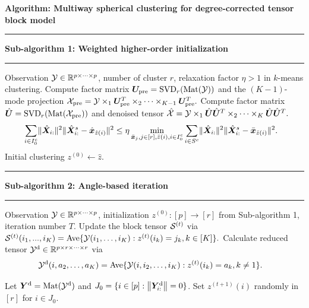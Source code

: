 \documentclass[lettersize,onecolumn,journal]{IEEEtran}
\theoremstyle{definition}
\theoremstyle{definition}
\newcommand\Algphase[1]{%
\vspace*{-.7\baselineskip}\Statex\hspace*{\dimexpr-\algorithmicindent-2pt\relax}\rule{\columnwidth}{0.4pt}%
\Statex\hspace*{-\algorithmicindent}\textbf{#1}%
\vspace*{-.7\baselineskip}\Statex\hspace*{\dimexpr-\algorithmicindent-2pt\relax}\rule{\columnwidth}{0.4pt}%
}
\begin{document}
\begin{algorithm}[h!]
\caption*{\bf Algorithm: Multiway spherical clustering for degree-corrected tensor block model }
\vspace{.15cm}
\begin{algorithmic}[1]
\Algphase{Sub-algorithm 1: Weighted higher-order initialization}
\INPUT Observation $\mathcal{Y} \in \mathbb{R}^{p\times \cdots \times p}$, number of cluster $r$, relaxation factor $\eta > 1$ in $k$-means clustering.
\State Compute factor matrix $ \bm{U}_{\text{pre}} = \text{SVD}_{r} (\text{Mat}(\mathcal{Y}))$ and the $(K-1)$-mode projection $
\mathcal{X}_{\text{pre}} = \mathcal{Y} \times_1  \bm{U}_{\text{pre}}^T \times_2 \cdots \times_{K-1} \bm{U}_{\text{pre}}^T.$
\State Compute factor matrix $\hat {\bm{U}} = \text{SVD}_{r}(\text{Mat}(\mathcal{X}_{\text{pre}}))$ and denoised tensor
$\hat {\mathcal{X}} = \mathcal{Y} \times_1 \hat {\bm{U}} \hat {\bm{U}}^T \times_2 \cdots \times_K \hat {\bm{U}} \hat {\bm{U}}^T.$
\begin{align}
    &\sum_{i \in I_0^c }  \lVert\hat {\bm X}_{i:}\rVert^2 \lVert\hat {\bm X}_{i:}^s - \hat {\bm x}_{\hat z(i)} \rVert^2 
    \leq 
    \eta \min_{\substack{\bar {\bm x}_j, j\in[r], \bar z(i),i\in I_0^{c}}} \sum_{i \in S^c } \lVert\hat {\bm X}_{i:}\rVert^2 \lVert \hat {\bm X}_{i:}^s -   \bar {\bm x}_{\bar z(i)}\rVert^2.
\end{align}
\OUTPUT Initial clustering $z^{(0)} \leftarrow \hat z$.

\Algphase{Sub-algorithm 2: Angle-based iteration}
\INPUT Observation $\mathcal{Y} \in \mathbb{R}^{p \times \cdots \times p}$, initialization $z^{(0)} \colon [p]\to[r]$ from Sub-algorithm 1, iteration number $T$.
\State Update the block tensor $\mathcal{S}^{(t)}$ via
$\mathcal{S}^{(t)} (i_1,...,i_K)= \text{Ave} \{\mathcal{Y}(i_1,\ldots,i_K): z^{(t)}(i_k) = j_k, k \in [K]\}.$
\State Calculate reduced tensor $\mathcal{Y}^{\text{d}} \in \mathbb{R}^{p \times r \times \cdots \times r}$ via
\begin{align}
    &\mathcal{Y}^{\text{d}}(i,a_2,\ldots,a_K) 
    = 
\text{Ave}\{\mathcal{Y}(i,i_2,\ldots,i_K): z^{(t)}(i_k) = a_k, k \neq 1 \}.
\end{align}

\State Let $\bm Y^{\text{d}} = \text{Mat}(\mathcal{Y}^{\text{d}})$ and $J_0 = \{ i\in[p]: \left\lVert\bm Y^{\text{d}}_{i:}\right\rVert = 0\}$. Set $z^{(t+1)}(i)$ randomly in $[r]$ for $i \in J_0$.


\end{algorithmic}
\end{algorithm}
\end{document}
